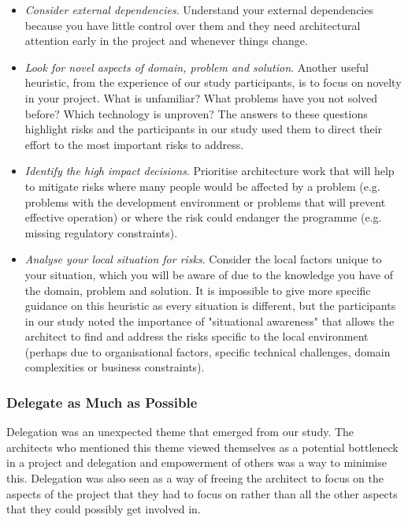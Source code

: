 \begin{itemize}
	\item \emph{Consider external dependencies}.  Understand your external dependencies because you have little control over them and they need architectural attention early in the project and whenever things change.
	\item \emph{Look for novel aspects of domain, problem and solution}.  Another useful heuristic, from the experience of our study participants, is to focus on novelty in your project.  What is unfamiliar?  What problems have you not solved before?  Which technology is unproven?  The answers to these questions highlight risks and the participants in our study used them to direct their effort to the most important risks to address.
	\item \emph{Identify the high impact decisions}.  Prioritise architecture work that will help to mitigate risks where many people would be affected by a problem (e.g. problems with the development environment or problems that will prevent effective operation) or where the risk could endanger the programme (e.g. missing regulatory constraints).
	\item \emph{Analyse your local situation for risks}.  Consider the local factors unique to your situation, which you will be aware of due to the knowledge you have of the domain, problem and solution.  It is impossible to give more specific guidance on this heuristic as every situation is different, but the participants in our study noted the importance of "situational awareness" \cite{wikipedia-sitawareness} that allows the architect to find and address the risks specific to the local environment (perhaps due to organisational factors, specific technical challenges, domain complexities or business constraints).
\end{itemize}

\subsubsection{Delegate as Much as Possible}

Delegation was an unexpected theme that emerged from our study. The architects who mentioned this theme viewed themselves as a potential bottleneck in a project and delegation and empowerment of others was a way to minimise this.  Delegation was also seen as a way of freeing the architect to focus on the aspects of the project that they had to focus on rather than all the other aspects that they could possibly get involved in.

